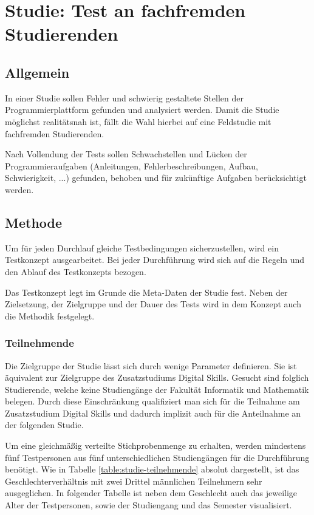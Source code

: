 \section{Studie: Test an fachfremden Studierenden}\label{studie}
\subsection{Allgemein}
In einer Studie sollen Fehler und schwierig gestaltete Stellen der
Programmierplattform gefunden und analysiert werden. Damit die Studie möglichst
realitätsnah ist, fällt die Wahl hierbei auf eine Feldstudie mit fachfremden
Studierenden.

Nach Vollendung der Tests sollen Schwachstellen und Lücken der
Programmieraufgaben (Anleitungen, Fehlerbeschreibungen, Aufbau,
Schwierigkeit, ...) gefunden, behoben und für zukünftige Aufgaben berücksichtigt
werden. \parencite{studie-testkonzept}

\subsection{Methode}
Um für jeden Durchlauf gleiche Testbedingungen sicherzustellen, wird ein
Testkonzept ausgearbeitet. Bei jeder Durchführung wird sich auf die Regeln
und den Ablauf des Testkonzepts bezogen.

Das Testkonzept legt im Grunde die Meta-Daten der Studie fest. Neben der
Zielsetzung, der Zielgruppe und der Dauer des Tests wird in dem Konzept auch die
Methodik festgelegt.

\subsubsection{Teilnehmende}
Die Zielgruppe der Studie lässt sich durch wenige Parameter definieren. Sie
ist äquivalent zur Zielgruppe des Zusatzstudiums Digital Skills. Gesucht sind
folglich Studierende, welche keine Studiengänge der Fakultät Informatik und
Mathematik belegen. Durch diese Einschränkung qualifiziert man sich für die
Teilnahme am Zusatzstudium Digital Skills und dadurch implizit auch für die
Anteilnahme an der folgenden Studie.

Um eine gleichmäßig verteilte Stichprobenmenge zu erhalten, werden mindestens
fünf Testpersonen aus fünf unterschiedlichen Studiengängen für die Durchführung
benötigt. Wie in Tabelle \ref{table:studie-teilnehmende} absolut dargestellt,
ist das Geschlechterverhältnis mit zwei Drittel männlichen Teilnehmern sehr
ausgeglichen. In folgender Tabelle ist neben dem Geschlecht auch das jeweilige
Alter der Testpersonen, sowie der Studiengang und das Semester visualisiert.

